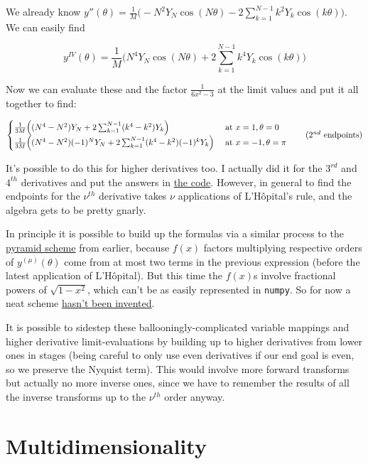 \documentclass[10pt]{article}
\begin{document}
We already know $y''(\theta) = \frac{1}{M} \Big(-N^2 Y_N \cos(N\theta) - 2 \sum_{k=1}^{N-1} k^2 Y_k \cos(k\theta) \Big)$. We can easily find

$$y^{IV}(\theta) = \frac{1}{M} \Big(N^4 Y_N \cos(N\theta) + 2 \sum_{k=1}^{N-1} k^4 Y_k \cos(k\theta) \Big)$$

Now we can evaluate these and the factor $\frac{1}{6x^2 - 3}$ at the limit values and put it all together to find: 

\[
\begin{cases} \frac{1}{3M} \Big((N^4 - N^2) Y_N + 2 \sum_{k=1}^{N-1} (k^4 - k^2) Y_k \Big) & \text{ at } x=1, \theta=0 \\ \frac{1}{3M} \Big((N^4 - N^2)(-1)^N Y_N + 2 \sum_{k=1}^{N-1} (k^4 - k^2) (-1)^k Y_k \Big) & \text{ at } x=-1, \theta=\pi \end{cases} \tag{$2^{nd}$ endpoints}
\]\vspace{2mm}

It's possible to do this for higher derivatives too. I actually did it for the $3^{rd}$ and $4^{th}$ derivatives and put the answers in \href{https://github.com/pavelkomarov/spectral-derivatives/blob/main/specderiv/specderiv.py}{the code}. However, in general to find the endpoints for the $\nu^{th}$ derivative takes $\nu$ applications of L'Hôpital's rule, and the algebra gets to be pretty gnarly.

In principle it is possible to build up the formulas via a similar process to the \hyperref[pyramid]{pyramid scheme} from earlier, because $f(x)$ factors multiplying respective orders of $y^{(\mu)}(\theta)$ come from at most two terms in the previous expression (before the latest application of L'Hôpital). But this time the $f(x)$s involve fractional powers of $\sqrt{1-x^2}$, which can't be as easily represented in \texttt{numpy}. So for now a neat scheme \href{https://github.com/pavelkomarov/spectral-derivatives/issues/1}{hasn't been invented}.

It is possible to sidestep these ballooningly-complicated variable mappings and higher derivative limit-evaluations by building up to higher derivatives from lower ones in stages (being careful to only use even derivatives if our end goal is even, so we preserve the Nyquist term). This would involve more forward transforms but actually no more inverse ones, since we have to remember the results of all the inverse transforms up to the $\nu^{th}$ order anyway.

\section{Multidimensionality}
\end{document}
